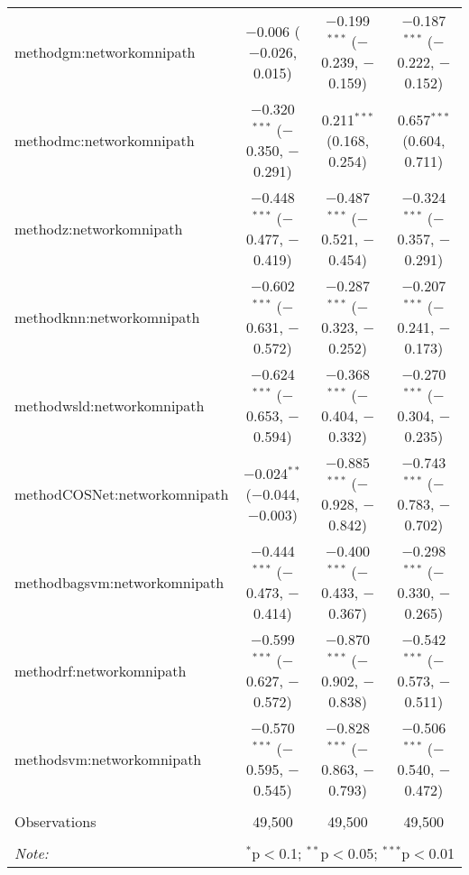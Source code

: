 \begin{table}[!htbp]
\begin{tabular}{@{\extracolsep{5pt}}lccc}
  methodgm:networkomnipath & $-$0.006 ($-$0.026, 0.015) & $-$0.199$^{***}$ ($-$0.239, $-$0.159) & $-$0.187$^{***}$ ($-$0.222, $-$0.152) \\ 
  methodmc:networkomnipath & $-$0.320$^{***}$ ($-$0.350, $-$0.291) & 0.211$^{***}$ (0.168, 0.254) & 0.657$^{***}$ (0.604, 0.711) \\ 
  methodz:networkomnipath & $-$0.448$^{***}$ ($-$0.477, $-$0.419) & $-$0.487$^{***}$ ($-$0.521, $-$0.454) & $-$0.324$^{***}$ ($-$0.357, $-$0.291) \\ 
  methodknn:networkomnipath & $-$0.602$^{***}$ ($-$0.631, $-$0.572) & $-$0.287$^{***}$ ($-$0.323, $-$0.252) & $-$0.207$^{***}$ ($-$0.241, $-$0.173) \\ 
  methodwsld:networkomnipath & $-$0.624$^{***}$ ($-$0.653, $-$0.594) & $-$0.368$^{***}$ ($-$0.404, $-$0.332) & $-$0.270$^{***}$ ($-$0.304, $-$0.235) \\ 
  methodCOSNet:networkomnipath & $-$0.024$^{**}$ ($-$0.044, $-$0.003) & $-$0.885$^{***}$ ($-$0.928, $-$0.842) & $-$0.743$^{***}$ ($-$0.783, $-$0.702) \\ 
  methodbagsvm:networkomnipath & $-$0.444$^{***}$ ($-$0.473, $-$0.414) & $-$0.400$^{***}$ ($-$0.433, $-$0.367) & $-$0.298$^{***}$ ($-$0.330, $-$0.265) \\ 
  methodrf:networkomnipath & $-$0.599$^{***}$ ($-$0.627, $-$0.572) & $-$0.870$^{***}$ ($-$0.902, $-$0.838) & $-$0.542$^{***}$ ($-$0.573, $-$0.511) \\ 
  methodsvm:networkomnipath & $-$0.570$^{***}$ ($-$0.595, $-$0.545) & $-$0.828$^{***}$ ($-$0.863, $-$0.793) & $-$0.506$^{***}$ ($-$0.540, $-$0.472) \\ 
 \hline \\[-1.8ex] 
Observations & 49,500 & 49,500 & 49,500 \\ 
\hline 
\hline \\[-1.8ex] 
\textit{Note:}  & \multicolumn{3}{r}{$^{*}$p$<$0.1; $^{**}$p$<$0.05; $^{***}$p$<$0.01} \\ 
\end{tabular} 
\end{table} 
